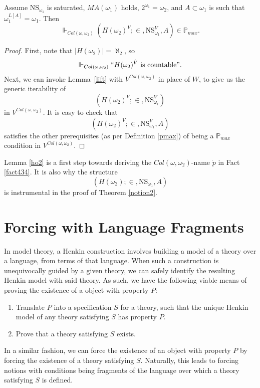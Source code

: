 \documentclass[12pt]{article}
\numberwithin{equation}{section}
\begin{document}
\begin{lem}\label{ho2}
Assume $\mathrm{NS}_{\omega_1}$ is saturated, $MA(\omega_1)$ holds, $2^{\omega_1} = \omega_2$, and $A \subset \omega_1$ is such that $\omega_1^{L[A]} = \omega_1$. Then $$\Vdash_{Col(\omega, \omega_2)} (H(\omega_2)^{\dot{V}}; \in, \mathrm{NS}_{\omega_1}^{\dot{V}}, A) \in \mathbb{P}_{max}.$$
\end{lem}
\begin{proof}
First, note that $|H(\omega_2)| = \aleph_2$, so $$\Vdash_{Col(\omega, \omega_2)} ``H(\omega_2)^{\dot{V}} \text{ is countable}".$$ Next, we can invoke Lemma~\ref{lift} with $V^{Col(\omega, \omega_2)}$ in place of $W$, to give us the generic iterability of $$(H(\omega_2)^{V}; \in, \mathrm{NS}_{\omega_1}^V)$$ in $V^{Col(\omega, \omega_2)}$. It is easy to check that $$(H(\omega_2)^{V}; \in, \mathrm{NS}_{\omega_1}^V, A)$$ satisfies the other prerequisites (as per Definition \ref{pmax}) of being a $\mathbb{P}_{max}$ condition in $V^{Col(\omega, \omega_2)}$. 
\end{proof}

Lemma \ref{ho2} is a first step towards deriving the $Col(\omega, \omega_2)$-name $\dot{p}$ in Fact \ref{fact434}. It is also why the structure 
\begin{equation*}
    (H(\omega_2); \in, \mathrm{NS}_{\omega_1}, A)
\end{equation*}
is instrumental in the proof of Theorem \ref{notion2}.

\section{Forcing with Language Fragments}\label{setupsec}

In model theory, a Henkin construction involves building a model of a theory over a language, from terms of that language. When such a construction is unequivocally guided by a given theory, we can safely identify the resulting Henkin model with said theory. As such, we have the following viable means of proving the existence of a object with property $P$: 
\begin{enumerate}
    \item Translate $P$ into a specification $S$ for a theory, such that the unique Henkin model of any theory satisfying $S$ has property $P$.
    \item Prove that a theory satisfying $S$ exists.
\end{enumerate}
In a similar fashion, we can force the existence of an object with property $P$ by forcing the existence of a theory satisfying $S$. Naturally, this leads to forcing notions with conditions being fragments of the language over which a theory satisfying $S$ is defined.
\end{document}
